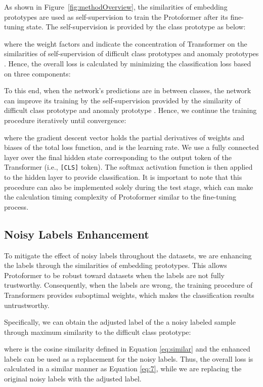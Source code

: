 \documentclass[letterpaper]{article} \usepackage{aaai22}  \usepackage{times}  \usepackage{helvet}  \usepackage{courier}  \usepackage{amsmath,amssymb}
\begin{document}
As shown in Figure~\ref{fig:methodOverview}, the similarities of embedding prototypes are used as self-supervision to train the Protoformer  after its fine-tuning state. The self-supervision is provided by the class prototype as below:
 
where the weight factors  and  indicate the concentration of Transformer on the similarities of self-supervision of difficult class prototypes  and anomaly prototypes .
Hence, the overall loss is calculated by minimizing the classification loss based on three components:


To this end, when the network's predictions are in between classes, the network can improve its training by the self-supervision provided by the similarity of difficult class prototype  and anomaly prototype . Hence, we continue the training procedure iteratively until convergence:

where the gradient descent vector  holds the partial derivatives of weights and biases of the total loss function, and  is the learning rate.
We use a fully connected layer over
the final hidden state corresponding to the output token of the Transformer (i.e., \texttt{[CLS]} token). The softmax activation function is then applied to the hidden layer to provide classification.
It is important to note that this procedure can also be implemented solely during the test stage, which can make the calculation timing complexity of Protoformer similar to the fine-tuning process.



\subsection{Noisy Labels Enhancement}
\label{sec:noisy}
To mitigate the effect of noisy labels throughout the datasets, we are enhancing the labels through the similarities of embedding prototypes. This allows Protoformer to be robust toward datasets when the labels are not fully trustworthy. Consequently, when the labels are wrong, the training procedure of Transformers provides suboptimal weights, which makes the classification results untrustworthy.

Specifically, we can obtain the adjusted label of the a noisy labeled sample through maximum similarity to the difficult class prototype:

where  is the cosine similarity defined in Equation
\eqref{eq:similar} and the enhanced labels  can be used as a replacement for the noisy labels. Thus, the overall loss is calculated in a similar manner as Equation \eqref{eq:7}, while we are replacing the original noisy labels with the adjusted label.
\end{document}
